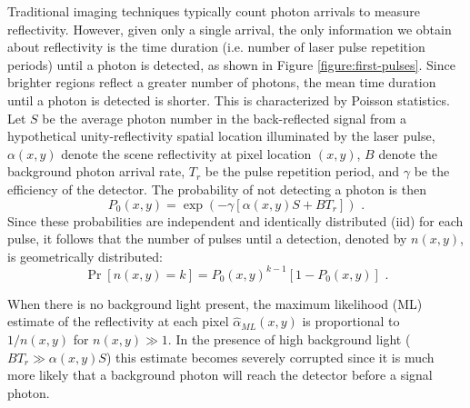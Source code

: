 Traditional imaging techniques typically count photon arrivals to measure reflectivity. However, given only a single arrival, the only information we obtain about reflectivity is the time duration (i.e. number of laser pulse repetition periods) until a photon is detected, as shown in Figure \ref{figure:first-pulses}. Since brighter regions reflect a greater number of photons, the mean time duration until a photon is detected is shorter. This is characterized by Poisson statistics. Let $S$ be the average photon number in the back-reflected signal from a hypothetical unity-reflectivity spatial location illuminated by the laser pulse, $\alpha(x,y)$ denote the scene reflectivity at pixel location $(x,y)$, $B$ denote the background photon arrival rate, $T_r$ be the pulse repetition period, and $\gamma$ be the efficiency of the detector. The probability of not detecting a photon is then
\begin{equation}
P_0(x, y) = \exp\left(-\gamma[\alpha(x,y)S + BT_r]\right)\,\,.
\label{equation:first-probdetect}
\end{equation}
Since these probabilities are independent and identically distributed (iid) for each pulse, it follows that the number of pulses until a detection, denoted by $n(x, y)$, is geometrically distributed:
\begin{equation}
\operatorname{Pr}\left[n(x,y) = k \right] = P_0(x,y)^{k-1} \left[ 1 - P_0(x,y) \right]\,\,.
\label{equation:first-geometric}
\end{equation}

When there is no background light present, the maximum likelihood (ML) estimate of the reflectivity at each pixel $\hat{\alpha}_{ML}(x,y)$ is proportional to $1/n(x,y)$ for $n(x,y) \gg 1$. In the presence of high background light ($B T_r \gg \alpha(x,y) S$) this estimate becomes severely corrupted since it is much more likely that a background photon will reach the detector before a signal photon.

